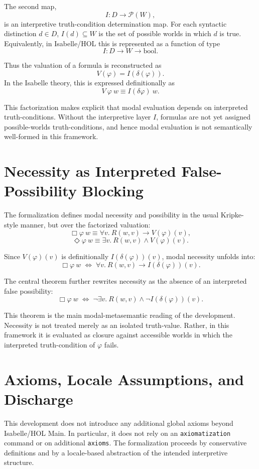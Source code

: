\documentclass[11pt,a4paper]{article}
\begin{document}
The second map,
\[
I : D \to \mathcal{P}(W),
\]
is an interpretive truth-condition determination map. For each syntactic distinction $d \in D$, $I(d) \subseteq W$ is the set of possible worlds in which $d$ is true. Equivalently, in Isabelle/HOL this is represented as a function of type
\[
I : D \to W \to \mathrm{bool}.
\]

Thus the valuation of a formula is reconstructed as
\[
V(\varphi) = I(\delta(\varphi)).
\]
In the Isabelle theory, this is expressed definitionally as
\[
V\ \varphi\ w \equiv I(\delta \varphi)\ w.
\]

This factorization makes explicit that modal evaluation depends on interpreted truth-conditions. Without the interpretive layer $I$, formulas are not yet assigned possible-worlds truth-conditions, and hence modal evaluation is not semantically well-formed in this framework.

\section{Necessity as Interpreted False-Possibility Blocking}

The formalization defines modal necessity and possibility in the usual Kripke-style manner, but over the factorized valuation:
\[
\Box \varphi\ w \equiv \forall v.\ R(w,v) \longrightarrow V(\varphi)(v),
\]
\[
\Diamond \varphi\ w \equiv \exists v.\ R(w,v) \wedge V(\varphi)(v).
\]

Since $V(\varphi)(v)$ is definitionally $I(\delta(\varphi))(v)$, modal necessity unfolds into:
\[
\Box \varphi\ w
\;\Longleftrightarrow\;
\forall v.\ R(w,v) \longrightarrow I(\delta(\varphi))(v).
\]

The central theorem further rewrites necessity as the absence of an interpreted false possibility:
\[
\Box \varphi\ w
\;\Longleftrightarrow\;
\neg \exists v.\ R(w,v) \wedge \neg I(\delta(\varphi))(v).
\]

This theorem is the main modal-metasemantic reading of the development. Necessity is not treated merely as an isolated truth-value. Rather, in this framework it is evaluated as closure against accessible worlds in which the interpreted truth-condition of $\varphi$ fails.

\section{Axioms, Locale Assumptions, and Discharge}

This development does not introduce any additional global axioms beyond Isabelle/HOL Main. In particular, it does not rely on an \texttt{axiomatization} command or on additional \texttt{axioms}. The formalization proceeds by conservative definitions and by a locale-based abstraction of the intended interpretive structure.
\end{document}
